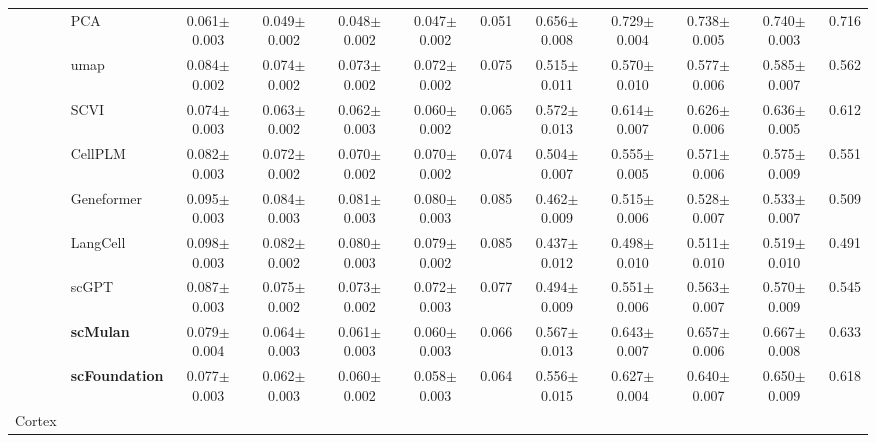 \begin{table}[htbp]
\begin{tabular}{cl|ccccc|ccccc}
    & PCA      & \cellcolor{gray!25}0.061$\pm$0.003 & \cellcolor{gray!25}0.049$\pm$0.002 & \cellcolor{gray!25}0.048$\pm$0.002 & \cellcolor{gray!25}0.047$\pm$0.002 & \cellcolor{gray!25}0.051      & \cellcolor{gray!25}0.656$\pm$0.008 & \cellcolor{gray!25}0.729$\pm$0.004 & \cellcolor{gray!25}0.738$\pm$0.005 & \cellcolor{gray!25}0.740$\pm$0.003 & \cellcolor{gray!25}0.716 \\
    & umap      & 0.084$\pm$0.002 & 0.074$\pm$0.002 & 0.073$\pm$0.002 & 0.072$\pm$0.002 & 0.075      & 0.515$\pm$0.011 & 0.570$\pm$0.010 & 0.577$\pm$0.006 & 0.585$\pm$0.007 & 0.562 \\
    & SCVI      & 0.074$\pm$0.003 & 0.063$\pm$0.002 & 0.062$\pm$0.003 & 0.060$\pm$0.002 & 0.065      & 0.572$\pm$0.013 & 0.614$\pm$0.007 & 0.626$\pm$0.006 & 0.636$\pm$0.005 & 0.612 \\
    & CellPLM      & 0.082$\pm$0.003 & 0.072$\pm$0.002 & 0.070$\pm$0.002 & 0.070$\pm$0.002 & 0.074      & 0.504$\pm$0.007 & 0.555$\pm$0.005 & 0.571$\pm$0.006 & 0.575$\pm$0.009 & 0.551 \\
    & Geneformer      & 0.095$\pm$0.003 & 0.084$\pm$0.003 & 0.081$\pm$0.003 & 0.080$\pm$0.003 & 0.085      & 0.462$\pm$0.009 & 0.515$\pm$0.006 & 0.528$\pm$0.007 & 0.533$\pm$0.007 & 0.509 \\
    & LangCell      & 0.098$\pm$0.003 & 0.082$\pm$0.002 & 0.080$\pm$0.003 & 0.079$\pm$0.002 & 0.085      & 0.437$\pm$0.012 & 0.498$\pm$0.010 & 0.511$\pm$0.010 & 0.519$\pm$0.010 & 0.491 \\
    & scGPT      & 0.087$\pm$0.003 & 0.075$\pm$0.002 & 0.073$\pm$0.002 & 0.072$\pm$0.003 & 0.077      & 0.494$\pm$0.009 & 0.551$\pm$0.006 & 0.563$\pm$0.007 & 0.570$\pm$0.009 & 0.545 \\
    & \cellcolor{gray!25}\textbf{scMulan}      & 0.079$\pm$0.004 & 0.064$\pm$0.003 & 0.061$\pm$0.003 & 0.060$\pm$0.003 & 0.066      & 0.567$\pm$0.013 & 0.643$\pm$0.007 & 0.657$\pm$0.006 & 0.667$\pm$0.008 & 0.633 \\
    & \cellcolor{gray!25}\textbf{scFoundation}      & 0.077$\pm$0.003 & 0.062$\pm$0.003 & 0.060$\pm$0.002 & 0.058$\pm$0.003 & 0.064      & 0.556$\pm$0.015 & 0.627$\pm$0.004 & 0.640$\pm$0.007 & 0.650$\pm$0.009 & 0.618 \\
    \midrule

    \multirow{9}{*}{Cortex}


\end{tabular}
\end{table}
